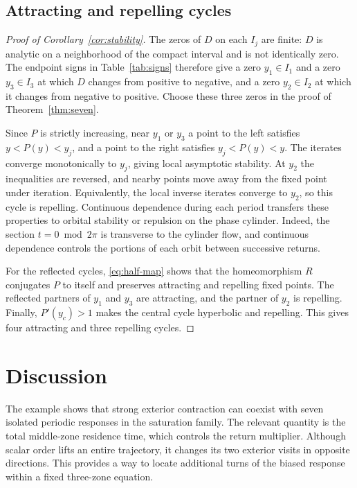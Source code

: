 \documentclass[11pt,a4paper]{article}
\begin{document}
\subsection{Attracting and repelling cycles}
\begin{proof}[Proof of Corollary~\ref{cor:stability}]
The zeros of $D$ on each $I_j$ are finite: $D$ is analytic on a
neighborhood of the compact interval and is not identically zero.
The endpoint signs in Table~\ref{tab:signs} therefore give a zero
$y_1\in I_1$ and a zero $y_3\in I_3$ at which $D$ changes from
positive to negative, and a zero $y_2\in I_2$ at which it changes from
negative to positive. Choose these three zeros in the proof of
Theorem~\ref{thm:seven}.

Since $P$ is strictly increasing, near $y_1$ or $y_3$ a point to the
left satisfies $y<P(y)<y_j$, and a point to the right satisfies
$y_j<P(y)<y$. The iterates converge monotonically to $y_j$, giving
local asymptotic stability. At $y_2$ the inequalities are reversed,
and nearby points move away from the fixed point under iteration.
Equivalently, the local inverse iterates converge to $y_2$, so this
cycle is repelling. Continuous dependence during each period transfers
these properties to orbital stability or repulsion on the phase cylinder.
Indeed, the section $t=0\bmod 2\pi$ is transverse to the cylinder flow,
and continuous dependence controls the portions of each orbit between
successive returns.

For the reflected cycles, \eqref{eq:half-map} shows that the
homeomorphism $R$ conjugates $P$ to itself and preserves attracting
and repelling fixed points.
The reflected partners of $y_1$ and $y_3$ are attracting, and the
partner of $y_2$ is repelling. Finally, $P'(y_c)>1$ makes the central
cycle hyperbolic and repelling. This gives four attracting and three
repelling cycles.
\end{proof}

\section{Discussion}
The example shows that strong exterior contraction can coexist with
seven isolated periodic responses in the saturation family. The
relevant quantity is the total middle-zone residence time, which
controls the return multiplier. Although scalar order lifts an entire
trajectory, it changes its two exterior visits in opposite directions.
This provides a way to locate additional turns of the biased response
within a fixed three-zone equation.
\end{document}
